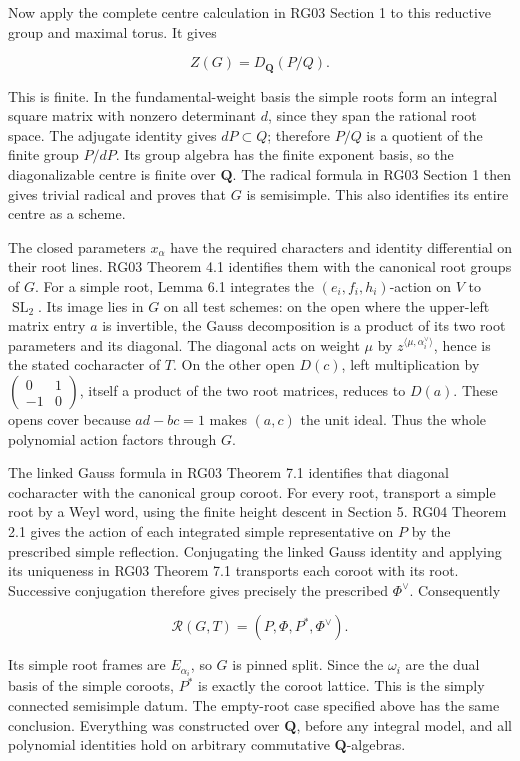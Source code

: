 \documentclass[11pt,a4paper,openany]{report}
\begin{document}
Now apply the complete centre calculation in RG03 Section 1 to this reductive group and maximal torus. It gives

\[
Z(G)=D_{\mathbf Q}(P/Q).
\]

This is finite. In the fundamental-weight basis the simple roots form an integral square matrix with nonzero determinant \(d\), since they span the rational root space. The adjugate identity gives \(dP\subset Q\); therefore \(P/Q\) is a quotient of the finite group \(P/dP\). Its group algebra has the finite exponent basis, so the diagonalizable centre is finite over \(\mathbf Q\). The radical formula in RG03 Section 1 then gives trivial radical and proves that \(G\) is semisimple. This also identifies its entire centre as a scheme.

The closed parameters \(x_\alpha\) have the required characters and identity differential on their root lines. RG03 Theorem 4.1 identifies them with the canonical root groups of \(G\). For a simple root, Lemma 6.1 integrates the \((e_i,f_i,h_i)\)-action on \(V\) to \(\operatorname{SL}_2\). Its image lies in \(G\) on all test schemes: on the open where the upper-left matrix entry \(a\) is invertible, the Gauss decomposition is a product of its two root parameters and its diagonal. The diagonal acts on weight \(\mu\) by \(z^{\langle\mu,\alpha_i^\vee\rangle}\), hence is the stated cocharacter of \(T\). On the other open \(D(c)\), left multiplication by \(\left(\begin{smallmatrix}0&1\\-1&0\end{smallmatrix}\right)\), itself a product of the two root matrices, reduces to \(D(a)\). These opens cover because \(ad-bc=1\) makes \((a,c)\) the unit ideal. Thus the whole polynomial action factors through \(G\).

The linked Gauss formula in RG03 Theorem 7.1 identifies that diagonal cocharacter with the canonical group coroot. For every root, transport a simple root by a Weyl word, using the finite height descent in Section 5. RG04 Theorem 2.1 gives the action of each integrated simple representative on \(P\) by the prescribed simple reflection. Conjugating the linked Gauss identity and applying its uniqueness in RG03 Theorem 7.1 transports each coroot with its root. Successive conjugation therefore gives precisely the prescribed \(\Phi^\vee\). Consequently

\[
\mathcal R(G,T)=(P,\Phi,P^*,\Phi^\vee).
\tag{6.2}
\]

Its simple root frames are \(E_{\alpha_i}\), so \(G\) is pinned split. Since the \(\omega_i\) are the dual basis of the simple coroots, \(P^*\) is exactly the coroot lattice. This is the simply connected semisimple datum. The empty-root case specified above has the same conclusion. Everything was constructed over \(\mathbf Q\), before any integral model, and all polynomial identities hold on arbitrary commutative \(\mathbf Q\)-algebras.
\end{document}
